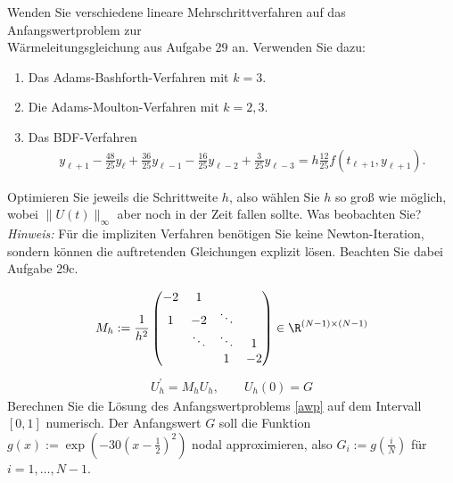 \begin{exercise}
Wenden Sie verschiedene lineare Mehrschrittverfahren auf das Anfangswertproblem zur\\
Wärmeleitungsgleichung aus Aufgabe 29 an. Verwenden Sie dazu:
\begin{enumerate}[label = \textbf{\alph*)}]
  \item Das Adams-Bashforth-Verfahren mit $k = 3$.
  \item Die Adams-Moulton-Verfahren mit $k = 2,3$.
  \item Das BDF-Verfahren
  \begin{align*}
    y_{\ell + 1} - \frac{48}{25}y_{\ell} + \frac{36}{25}y_{\ell - 1} - \frac{16}{25}y_{\ell - 2}
    + \frac{3}{25}y_{\ell - 3} = h\frac{12}{25}f(t_{\ell + 1},y_{\ell + 1}).
  \end{align*}
\end{enumerate}
Optimieren Sie jeweils die Schrittweite $h$, also wählen Sie $h$ so groß wie möglich,
wobei $\|U(t)\|_{\infty}$ aber noch in der Zeit fallen sollte. Was beobachten Sie? \\
\textit{Hinweis:} Für die impliziten Verfahren benötigen Sie keine Newton-Iteration,
sondern können die auftretenden Gleichungen explizit lösen. Beachten Sie dabei Aufgabe 29c.
\end{exercise}
\begin{solution}
\begin{align}
  M_h := \frac{1}{h^2}\begin{pmatrix}
    -2 & 1 & &  \\
    1 & -2 & \ddots & \\
    & \ddots & \ddots & 1 \\
    & & 1 & -2
  \end{pmatrix}
  \in \R^{(N-1)\times (N-1)}
\end{align}
\begin{align}\label{awp}
  U_h^{\prime} = M_hU_h, \qquad U_h(0) = G
\end{align}
Berechnen Sie die Lösung des Anfangswertproblems \eqref{awp} auf dem Intervall
$[0,1]$ numerisch. Der Anfangswert $G$ soll die Funktion
$g(x) := \exp\left(-30\left(x-\frac{1}{2}\right)^2\right)$ nodal approximieren, also
$G_i := g\left(\frac{i}{N}\right)$ für $i = 1,\dots,N-1$.
\end{solution}
